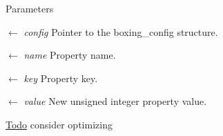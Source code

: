 \begin{DoxyParams}{Parameters}
\item[\mbox{$\leftarrow$} {\em config}]Pointer to the boxing\_\-config structure. \item[\mbox{$\leftarrow$} {\em name}]Property name. \item[\mbox{$\leftarrow$} {\em key}]Property key. \item[\mbox{$\leftarrow$} {\em value}]New unsigned integer property value.\end{DoxyParams}
\begin{Desc}
\item[\hyperlink{todo__todo000001}{Todo}]consider optimizing \end{Desc}
